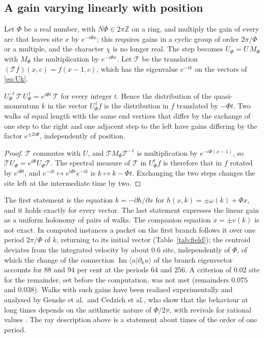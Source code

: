 \subsection{A gain varying linearly with position}
Let $\Phi$ be a real number, with $N\Phi\in2\pi\mathbb{Z}$ on a ring, and multiply the gain of every arc that leaves site $x$ by $e^{-i\Phi x}$; this requires gains in a cyclic group of order $2\pi/\Phi$ or a multiple, and the character $\chi$ is no longer real. The step becomes $U_\Phi=U\,M_\Phi$ with $M_\Phi$ the multiplication by $e^{-i\Phi x}$. Let $\mathcal{T}$ be the translation $(\mathcal{T}f)(x,c)=f(x-1,c)$, which has the eigenvalue $e^{-ik}$ on the vectors of \eqref{eq:Uk}.

\begin{proposition}\label{prop:field}
$U_\Phi^{-t}\,\mathcal{T}\,U_\Phi^{\,t}=e^{i\Phi t}\,\mathcal{T}$ for every integer $t$. Hence the distribution of the quasi-momentum $k$ in the vector $U_\Phi^{\,t}f$ is the distribution in $f$ translated by $-\Phi t$. Two walks of equal length with the same end vertices that differ by the exchange of one step to the right and one adjacent step to the left have gains differing by the factor $e^{\pm2i\Phi}$, independently of position.
\end{proposition}
\begin{proof}
$\mathcal{T}$ commutes with $U$, and $\mathcal{T}M_\Phi\mathcal{T}^{-1}$ is multiplication by $e^{-i\Phi(x-1)}$, so $\mathcal{T}U_\Phi=e^{i\Phi}U_\Phi\mathcal{T}$. The spectral measure of $\mathcal{T}$ in $U_\Phi^tf$ is therefore that in $f$ rotated by $e^{i\Phi t}$, and $e^{-ik}\mapsto e^{i\Phi t}e^{-ik}$ is $k\mapsto k-\Phi t$. Exchanging the two steps changes the site left at the intermediate time by two.
\end{proof}

The first statement is the equation $\dot k=-\partial h/\partial x$ for $h(x,k)=\pm\omega(k)+\Phi x$, and it holds exactly for every vector. The last statement expresses the linear gain as a uniform holonomy of pairs of walks. The companion equation $\dot x=\pm v(k)$ is not exact. In computed instances a packet on the first branch follows it over one period $2\pi/\Phi$ of $k$, returning to its initial vector (Table~\ref{tab:field}); the centroid deviates from the integrated velocity by about $0.6$ site, independently of $\Phi$, of which the change of the connection $\operatorname{Im}\langle u|\partial_ku\rangle$ of the branch eigenvector accounts for $88$ and $94$ per cent at the periods $64$ and $256$. A criterion of $0.02$ site for the remainder, set before the computation, was not met (remainders $0.075$ and $0.038$). Walks with such gains have been realized experimentally and analysed by Genske et al.\ and Cedzich et al., who show that the behaviour at long times depends on the arithmetic nature of $\Phi/2\pi$, with revivals for rational values \cite{genske,cedzich}. The ray description above is a statement about times of the order of one period.

